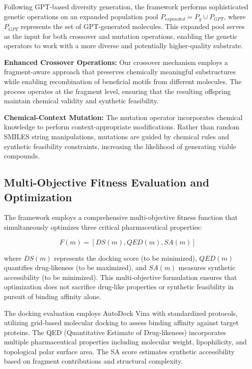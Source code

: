 \documentclass[lettersize,journal]{IEEEtran}
\begin{document}
Following GPT-based diversity generation, the framework performs sophisticated genetic operations on an expanded population pool $P_{expanded} = P_g \cup P_{GPT}$, where $P_{GPT}$ represents the set of GPT-generated molecules. This expanded pool serves as the input for both crossover and mutation operations, enabling the genetic operators to work with a more diverse and potentially higher-quality substrate.

\noindent \textbf{Enhanced Crossover Operations:} Our crossover mechanism employs a fragment-aware approach that preserves chemically meaningful substructures while enabling recombination of beneficial motifs from different molecules. The process operates at the fragment level, ensuring that the resulting offspring maintain chemical validity and synthetic feasibility.

\noindent \textbf{Chemical-Context Mutation:} The mutation operator incorporates chemical knowledge to perform context-appropriate modifications. Rather than random SMILES string manipulations, mutations are guided by chemical rules and synthetic feasibility constraints, increasing the likelihood of generating viable compounds.

\subsection{Multi-Objective Fitness Evaluation and Optimization}

The framework employs a comprehensive multi-objective fitness function that simultaneously optimizes three critical pharmaceutical properties:

\begin{equation}
F(m) = [DS(m), QED(m), SA(m)]
\end{equation}

where $DS(m)$ represents the docking score (to be minimized), $QED(m)$ quantifies drug-likeness (to be maximized), and $SA(m)$ measures synthetic accessibility (to be minimized). This multi-objective formulation ensures that optimization does not sacrifice drug-like properties or synthetic feasibility in pursuit of binding affinity alone.

The docking evaluation employs AutoDock Vina with standardized protocols, utilizing grid-based molecular docking to assess binding affinity against target proteins. The QED (Quantitative Estimate of Drug-likeness) incorporates multiple pharmaceutical properties including molecular weight, lipophilicity, and topological polar surface area. The SA score estimates synthetic accessibility based on fragment contributions and structural complexity.
\end{document}
